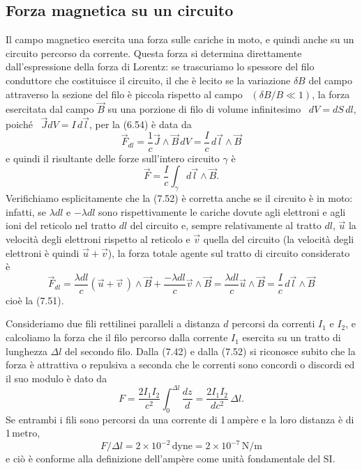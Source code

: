 \subsection{Forza magnetica su un circuito}

Il campo magnetico esercita una forza sulle cariche in moto, e quindi anche su
un circuito percorso da corrente. Questa forza si determina direttamente
dall'espressione della forza di Lorentz: se trascuriamo lo spessore del filo
conduttore che costituisce il circuito, il che \`e lecito se la variazione
$\delta B$ del campo attraverso la sezione del filo \`e piccola rispetto al
campo \ $(\delta B/B\ll1)$, la forza esercitata dal campo $\vec B$ su una
porzione di filo di volume infinitesimo \ $dV=dS\,dl$, poich\'e
\ $\vec J dV=I\,d\vec l$, per la (6.54) \`e data da
\begin{equation}
  \vec F_{dl}=\frac{1}{c}\vec J\wedge\vec B\,dV=\frac{I}{c}\,d\vec l\wedge\vec B
  \tag{7.51}
\end{equation}
e quindi il risultante delle forze sull'intero circuito $\gamma$ \`e
\begin{equation}
  \vec F=\frac{I}{c}\int_\gamma d\vec l\wedge\vec B.
  \tag{7.52}
\end{equation}
Verifichiamo esplicitamente che la (7.52) \`e corretta anche se il circuito \`e
in moto: infatti, se $\lambda dl$ e $-\lambda dl$ sono rispettivamente le
cariche dovute agli elettroni e agli ioni del reticolo nel tratto $dl$ del
circuito e, sempre relativamente al tratto $dl$, $\vec u$ la velocit\`a degli
elettroni rispetto al reticolo e $\vec v$ quella del circuito (la velocit\`a
degli elettroni \`e quindi $\vec u+\vec v$), la forza totale agente sul tratto
di circuito considerato \`e
\begin{equation}
  \vec F_{dl}=\frac{\lambda dl}{c}(\vec u+\vec v\,)\wedge\vec B
  +\frac{-\lambda dl}{c}\vec v\wedge\vec B
  =\frac{\lambda dl}{c}\vec u\wedge\vec B=\frac{I}{c}\,d\vec l\wedge\vec B
  \tag{7.53}
\end{equation}
cio\`e la (7.51).

Consideriamo due fili rettilinei paralleli a distanza $d$ percorsi da correnti
$I_1$ e $I_2$, e calcoliamo la forza che il filo percorso dalla corrente $I_1$
esercita su un tratto di lunghezza $\Delta l$ del secondo filo. Dalla (7.42) e
dalla (7.52) si riconosce subito che la forza \`e attrattiva o repulsiva a
seconda che le correnti sono concordi o discordi ed il suo modulo \`e dato da
\begin{equation}
  F=\frac{2I_1I_2}{c^2}\int_0^{\Delta l}\frac{dz}{d}
  =\frac{2I_1I_2}{dc^2}\,\Delta l.
  \tag{7.54}
\end{equation}
Se entrambi i fili sono percorsi da una corrente di 1\,amp\`ere e la loro
distanza \`e di 1\,metro,
\begin{equation}
  F/\Delta l=2\times10^{-2}\,\mathrm{dyne}=2\times10^{-7}\,\mathrm{N/m}
  \tag{7.55}
\end{equation}
e ci\`o \`e conforme alla definizione dell'amp\`ere come unit\`a fondamentale
del SI.

